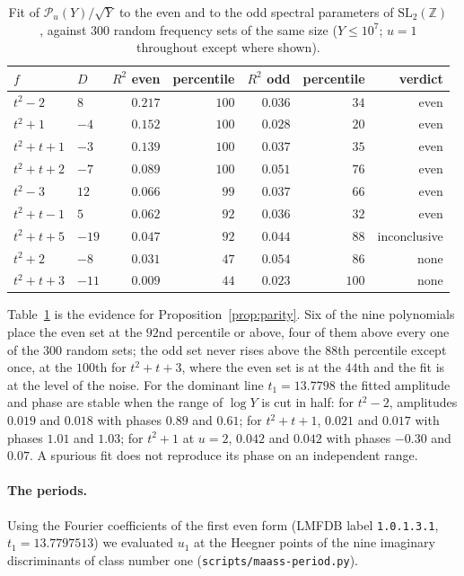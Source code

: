 \documentclass[11pt,a4paper]{article}
\theoremstyle{remark}\newtheorem{remark}[theorem]{Remark}
\newcommand{\Z}{\mathbb Z}\newcommand{\R}{\mathbb R}\newcommand{\Q}{\mathbb Q}\newcommand{\C}{\mathbb C}
\begin{document}
\begin{table}[htbp]
\centering\small
\caption{Fit of $\mathcal P_u(Y)/\sqrt Y$ to the even and to the odd spectral parameters of $\mathrm{SL}_2(\Z)$,
against $300$ random frequency sets of the same size ($Y\le10^7$; $u=1$ throughout except where shown).}\label{tab:fits}
\begin{tabular}{llrrrrr}
\toprule
$f$ & $D$ & $R^2$ even & percentile & $R^2$ odd & percentile & verdict\\
\midrule
$t^2-2$      & $8$    & $0.217$ & $100$ & $0.036$ & $34$ & even\\
$t^2+1$      & $-4$   & $0.152$ & $100$ & $0.028$ & $20$ & even\\
$t^2+t+1$    & $-3$   & $0.139$ & $100$ & $0.037$ & $35$ & even\\
$t^2+t+2$    & $-7$   & $0.089$ & $100$ & $0.051$ & $76$ & even\\
$t^2-3$      & $12$   & $0.066$ & $99$  & $0.037$ & $66$ & even\\
$t^2+t-1$    & $5$    & $0.062$ & $92$  & $0.036$ & $32$ & even\\
$t^2+t+5$    & $-19$  & $0.047$ & $92$  & $0.044$ & $88$ & inconclusive\\
$t^2+2$      & $-8$   & $0.031$ & $47$  & $0.054$ & $86$ & none\\
$t^2+t+3$    & $-11$  & $0.009$ & $44$  & $0.023$ & $100$& none\\
\bottomrule
\end{tabular}
\end{table}

Table~\ref{tab:fits} is the evidence for Proposition~\ref{prop:parity}. Six of the nine polynomials place the even set
at the $92$nd percentile or above, four of them above every one of the $300$ random sets; the odd set never rises above
the $88$th percentile except once, at the $100$th for $t^2+t+3$, where the even set is at the $44$th and the fit is
at the level of the noise. For the dominant line $t_1=13.7798$ the fitted amplitude and phase are stable when the
range of $\log Y$ is cut in half: for $t^2-2$, amplitudes $0.019$ and $0.018$ with phases $0.89$ and $0.61$; for
$t^2+t+1$, $0.021$ and $0.017$ with phases $1.01$ and $1.03$; for $t^2+1$ at $u=2$, $0.042$ and $0.042$ with phases
$-0.30$ and $0.07$. A spurious fit does not reproduce its phase on an independent range.

\paragraph{The periods.} Using the Fourier coefficients of the first even form (LMFDB label \texttt{1.0.1.3.1},
$t_1=13.7797513$) we evaluated $u_1$ at the Heegner points of the nine imaginary discriminants of class number one
(\texttt{scripts/maass-period.py}).
\end{document}
